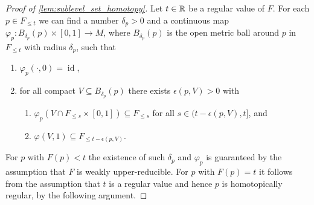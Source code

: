 \begin{proof}[Proof of \cref{lem:sublevel_set_homotopy}]
	Let $t \in \mathbb{R}$ be a regular value of $F$.
	For each $p \in F_{\leq t}$ we can find a number $\delta_{p} > 0$ and a continuous map $\varphi_{p} \colon B_{\delta_{p}}(p) \times [0,1] \to M$, where $B_{\delta_{p}}(p)$ is the open metric ball around $p$ in $F_{\leq t}$ with radius $\delta_{p}$, such that
	\begin{enumerate}
		\item $\varphi_{p}(\cdot,0) = \operatorname{id}$,
		\item for all compact $V \subseteq B_{\delta_{p}}(p)$ there exists $\epsilon(p,V) > 0$ with
		\begin{enumerate}
			\item $\varphi_{p}(V \cap F_{\leq s}\times [0,1]) \subseteq F_{\leq s}$ for all $s \in (t - \epsilon(p,V), t]$, and
			\item $\varphi(V,1) \subseteq F_{\leq t - \epsilon(p,V)}$.
		\end{enumerate}
	\end{enumerate}
	For $p$ with $F(p) < t$ the existence of such $\delta_{p}$ and $\varphi_{p}$ is guaranteed by the assumption that $F$ is weakly upper-reducible.
	For $p$ with $F(p) = t$ it follows from the assumption that $t$ is a regular value and hence $p$ is homotopically regular, by the following argument.


\end{proof}

